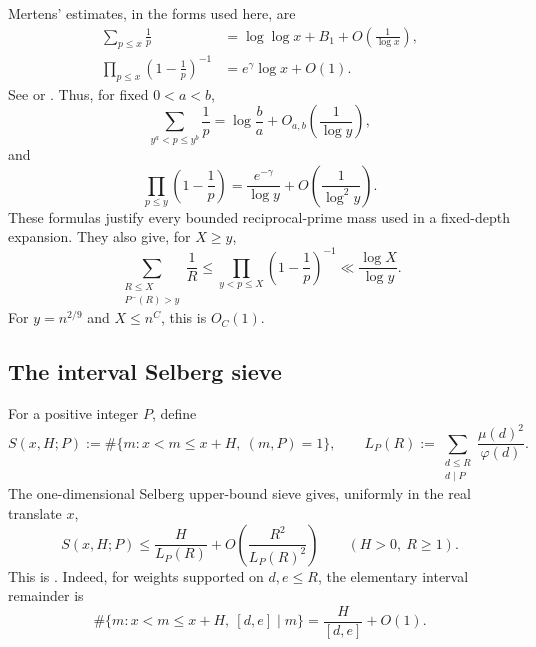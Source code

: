 \documentclass[11pt]{article}
\numberwithin{equation}{section}
\theoremstyle{definition}
\theoremstyle{remark}
\newcommand{\1}{\mathbf 1}
\begin{document}
Mertens' estimates, in the forms used here, are
\begin{align}
 \sum_{p\leq x}\frac1p
   &=\log\log x+B_1+O\!\left(\frac1{\log x}\right),
 \label{eq:Mertens-harmonic}\\
 \prod_{p\leq x}\left(1-\frac1p\right)^{-1}
   &=e^\gamma\log x+O(1).
 \label{eq:Mertens-product}
\end{align}
See \cite{Mertens1874} or
\cite[Theorem~2.7(d),(e)]{MontgomeryVaughan2007}.  Thus, for fixed
\(0<a<b\),
\begin{equation}
 \label{eq:Mertens-fixed-range}
 \sum_{y^a<p\leq y^b}\frac1p
 =\log\frac ba+O_{a,b}\!\left(\frac1{\log y}\right),
\end{equation}
and
\begin{equation}
 \label{eq:Mertens-sieve-density}
 \prod_{p\leq y}\left(1-\frac1p\right)
 =\frac{e^{-\gamma}}{\log y}
  +O\!\left(\frac1{\log^2y}\right).
\end{equation}
These formulas justify every bounded reciprocal-prime mass used in a
fixed-depth expansion.  They also give, for \(X\geq y\),
\[
 \sum_{\substack{R\leq X\\P^-(R)>y}}\frac1R
 \leq\prod_{y<p\leq X}\left(1-\frac1p\right)^{-1}
 \ll\frac{\log X}{\log y}.
\]
For \(y=n^{2/9}\) and \(X\leq n^C\), this is \(O_C(1)\).

\subsection{The interval Selberg sieve}
\label{subsec:selberg-sieve}

For a positive integer \(P\), define
\[
 S(x,H;P):=\#\{m:x<m\leq x+H,\ (m,P)=1\},
 \qquad
 L_P(R):=\sum_{\substack{d\leq R\\d\mid P}}
             \frac{\mu(d)^2}{\varphi(d)}.
\]
The one-dimensional Selberg upper-bound sieve gives, uniformly in the real
translate \(x\),
\begin{equation}
 \label{eq:Selberg-general}
 S(x,H;P)
 \leq \frac{H}{L_P(R)}
      +O\!\left(\frac{R^2}{L_P(R)^2}\right)
 \qquad(H>0,\ R\geq1).
\end{equation}
This is \cite[Theorem~3.2]{MontgomeryVaughan2007}.  Indeed, for weights
supported on \(d,e\leq R\), the elementary interval remainder is
\[
 \#\{m:x<m\leq x+H,\ [d,e]\mid m\}
       =\frac H{[d,e]}+O(1).
\]
\end{document}

